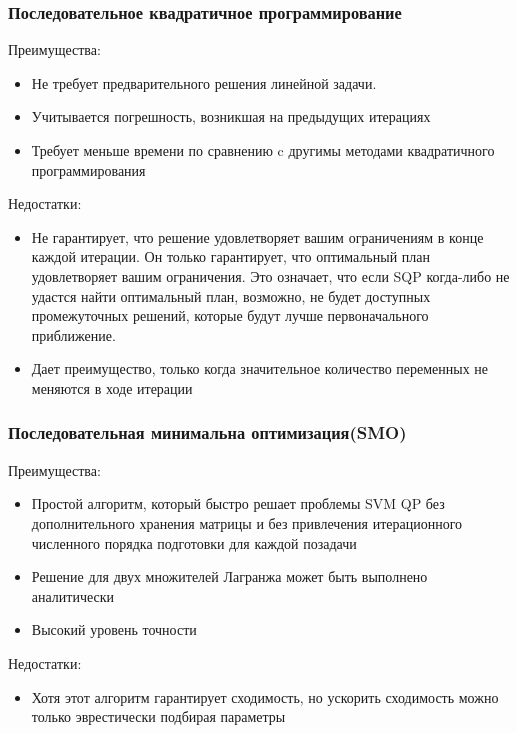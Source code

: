 \documentclass[main.tex]{subfiles}
\begin{document}
\subsubsection{Последовательное квадратичное программирование}
Преимущества:
\begin{itemize}
	\item Не требует предварительного решения линейной задачи.
	\item Учитывается погрешность, возникшая на предыдущих
	итерациях
	\item Требует меньше времени по сравнению c другимы методами квадратичного программирования
\end{itemize}
	

Недостатки:
\begin{itemize}
	\item Не гарантирует, что решение удовлетворяет вашим ограничениям в конце каждой итерации. Он только гарантирует, что оптимальный план удовлетворяет вашим ограничения. Это означает, что если SQP когда-либо не удастся найти оптимальный план, возможно, не будет доступных промежуточных решений, которые будут лучше первоначального приближение.
	\item Дает преимущество, только когда значительное количество
	переменных не меняются в ходе итерации

\end{itemize}

\subsubsection{Последовательная минимальна оптимизация(SMO)}
Преимущества:
\begin{itemize}
	\item Простой алгоритм, который быстро решает проблемы SVM QP без дополнительного хранения матрицы и без привлечения итерационного численного порядка подготовки для каждой позадачи
	\item Решение для двух множителей Лагранжа может быть выполнено
	аналитически
	\item Высокий уровень точности
\end{itemize}

Недостатки:
\begin{itemize}
	\item Хотя этот алгоритм гарантирует сходимость, но ускорить  сходимость можно только эврестически подбирая параметры
\end{itemize}
	
\end{document}
